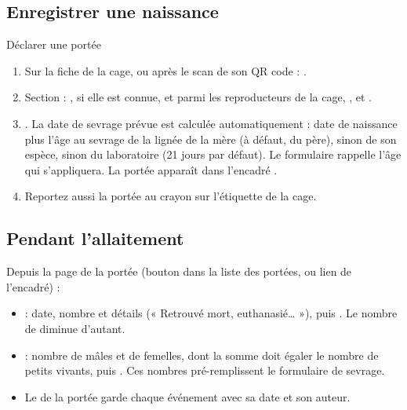 \documentclass[11pt,a4paper]{article}
\begin{document}
\subsection{Enregistrer une naissance}
\begin{procedure}{Déclarer une portée}
\begin{enumerate}
  \item Sur la fiche de la cage, ou après le scan de son QR code :
    .
  \item Section  : ,
     si elle est connue,  et 
    parmi les reproducteurs de la cage, ,
     et .
  \item {}. La date de sevrage prévue est
    calculée automatiquement : date de naissance plus l'âge au sevrage de la
    lignée de la mère (à défaut, du père), sinon de son espèce, sinon du
    laboratoire (21 jours par défaut). Le formulaire rappelle l'âge qui
    s'appliquera. La portée apparaît dans l'encadré .
  \item Reportez aussi la portée au crayon sur l'étiquette de la cage.
\end{enumerate}
\end{procedure}

\subsection{Pendant l'allaitement}
Depuis la page de la portée (bouton  dans la liste des portées,
ou lien de l'encadré) :
\begin{itemize}
  \item {} : date, nombre et détails
    (« Retrouvé mort, euthanasié… »), puis . Le
    nombre de  diminue d'autant.
  \item {} : nombre de mâles et de femelles, dont la somme doit
    égaler le nombre de petits vivants, puis .
    Ces nombres pré-remplissent le formulaire de sevrage.
  \item Le  de la portée garde chaque événement avec sa date et
    son auteur.
\end{itemize}
\end{document}
